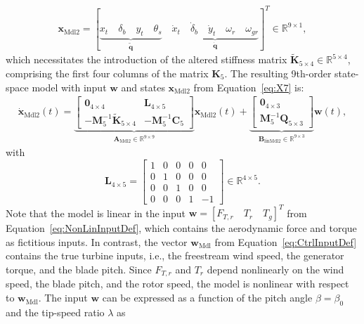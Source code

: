     \begin{align}\label{eq:X7}
        \bm{x}_{\text{Mdl2}} = [\underbrace{x_t \quad \delta_b \quad y_t \quad \theta_s}_{\tilde{\bm{q}}}   \quad \underbrace{\dot{x}_t \quad \dot{\delta}_b \quad \dot{y}_t  \quad {\omega}_r \quad {\omega}_{gr}}_{\dot{\bm{q}}}  ]^T \in \mathbb{R}^{9 \times 1},
    \end{align} 
    which necessitates the introduction of the altered stiffness matrix \(\tilde{\mathbf{K}}_{5 \times 4} \in \mathbb{R}^{5 \times 4}\), comprising the first four columns of the matrix \(\mathbf{K}_{5}\). The resulting 9th-order state-space model with input \(\bm{w}\) and states \(\bm{x}_{\text{Mdl2}}\) from Equation~\eqref{eq:X7} is:
    \begin{align}\label{eq:7state}
        \dot{\bm{x}}_{\text{Mdl2}}(t) = \underbrace{\begin{bmatrix}
                \bm{0}_{4 \times 4} & \mathbf{L}_{4 \times 5}  \\
                -\mathbf{M}_5^{-1}\tilde{\mathbf{K}}_{5 \times 4} & -\mathbf{M}_5^{-1}\mathbf{C}_5
        \end{bmatrix}}_{\bm{A}_{\text{Mdl2}}  \in \mathbb{R}^{9 \times 9}} \bm{x}_{\text{Mdl2}}(t) + \underbrace{\begin{bmatrix}
                \bm{0}_{4 \times 3} \\
                \mathbf{M}_5^{-1}\mathbf{Q}_{5 \times 3}
        \end{bmatrix}}_{\bm{B}_{\text{linMdl2}}  \in \mathbb{R}^{9 \times 3}} \bm{w}(t),  
    \end{align}
    with 
    \[
    \mathbf{L}_{4 \times5} = \begin{bmatrix}
        1 & 0 & 0 & 0 & 0 \\
        0 & 1 & 0 & 0 & 0 \\
        0 & 0 & 1 & 0 & 0 \\
        0 & 0 & 0 & 1 & -1
    \end{bmatrix} \in \mathbb{R}^{4 \times 5}.
    \]
    Note that the model is linear in the input $\bm{w} = [F_{T,r} \quad T_r \quad T_g]^T$ from Equation~\eqref{eq:NonLinInputDef}, which contains the aerodynamic force and torque as fictitious inputs. In contrast, the vector $\bm{w}_{\text{Mdl}}$ from Equation~\eqref{eq:CtrlInputDef} contains the true turbine inputs, i.e., the freestream wind speed, the generator torque, and the blade pitch. Since $F_{T,r}$ and $T_r$ depend nonlinearly on the wind speed, the blade pitch, and the rotor speed, the model is nonlinear with respect to $\bm{w}_{\text{Mdl}}$. The input $\bm{w}$ can be expressed as a function of the pitch angle $\beta = \beta_0$ and the tip-speed ratio $\lambda$ as

